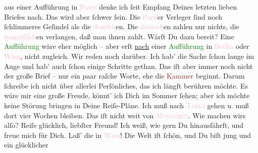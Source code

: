                aus einer Aufführung {\pb}in \textsc{\textcolor{pink}{Paris}{}\ledrightnote{\textcolor{pink}{Paris}}} denke ich ſeit Empfang Deines letzten lieben Briefes nach. Das wird aber ſchwer
               ſein. Die \textcolor{pink}{Pariſ}{}\ledrightnote{\textcolor{pink}{Paris}}er Verleger ſind noch ſchlimmeres
               Geſindel als die \textcolor{pink}{deutſch}{}en. Die
                  \textcolor{pink}{deutsch}{}en zahlen nur nichts,
               die \textcolor{pink}{franzöſiſch}{}en verlangen,
               daß man ihnen {\pb}zahlt. Wärſt Du dazu bereit? Eine \textcolor{green}{Aufführung}{} wäre eher möglich –
               aber erſt \uline{nach} einer \textcolor{green}{Aufführung}{} in \textcolor{pink}{Berlin}{}\ledrightnote{\textcolor{pink}{Berlin}} oder \textcolor{pink}{Wien}{}\ledrightnote{\textcolor{pink}{Wien}}, nicht
               zugleich. Wir reden noch darüber. Ich hab’ die Sache ſchon lange im Auge und hab’
               auch ſchon einige Schritte gethan.\pend
           \pstart
           {\pb}Das iſt aber immer noch nicht der große Brief – nur
               ein paar raſche Worte, ehe die \textcolor{brown}{Kammer}{} beginnt. Darum ſchreibe
               ich nicht über allerlei Perſönliches, das ich längſt berühren möchte.\pend
           \pstart
           Es wäre mir eine große Freude, könnt’ ich Dich im Sommer ſehen; aber ich möchte keine
                  {\pb}Störung bringen in Deine Reiſe-Pläne. \strikeout{\textcolor{gray}{×}} Ich muß nach \textsc{\textcolor{pink}{Toelz}{}\ledrightnote{\textcolor{pink}{Bad Tölz}}} gehen u. muß dort vier Wochen bleiben. Das iſt nicht weit von \textsc{\textcolor{pink}{Muenchen}{}\ledrightnote{\textcolor{pink}{München}}}. Wie machen wirs alſo?\pend
           \pstart
           Reiſe glücklich, liebſter Freund! Ich weiß, wie gern Du hinausfährſt, und freue mich
               für Dich. Laß’ die \label{K_L02737-4v}\label{K_L02737-4h} in \textcolor{pink}{Wien}{}\ledrightnote{\textcolor{pink}{Wien}}! Die Welt iſt ſchön, und Du biſt jung und ein glücklicher
